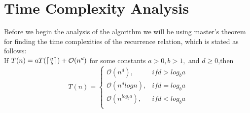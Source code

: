 \documentclass[12pt,a4paper]{article}%
\DeclarePairedDelimiter{\ceil}{\lceil}{\rceil}
\begin{document}
	\section{Time Complexity Analysis}
	\begin{flushleft}
		Before we begin the analysis of the algorithm we will be using master's theorem for finding the time complexities of the recurrence relation, which is stated as follows:\\\smallskip
		If $T(n)=aT(\ceil{\frac{n}{b}})+\mathcal{O}(n^d)$ for some constants $a > 0, b>1,$ and $d \geq 0$,then\\
		\begin{equation}
			T(n)= 
			\begin{cases}
			\mathcal{O}(n^d),& if d>log_b {a}\\
			\mathcal{O}(n^d log {n}) ,& if d=log_b {a}\\				\mathcal{O}(n^{log_b {a}}) ,& if d<log_b {a}\\
			\end{cases}
		\end{equation}
		
	\end{flushleft}
	
\end{document}
